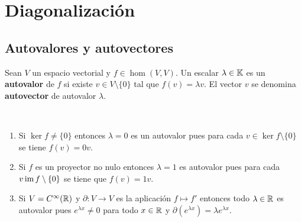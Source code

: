 \chapter{Diagonalización}


\section{Autovalores y autovectores}

\begin{block}
    Sean $V$ un espacio vectorial y $f\in\hom(V,V)$. Un escalar $\lambda\in\mathbb{K}$
    es un \textbf{autovalor} de $f$ si existe $v\in V\setminus\{0\}$ tal que
    $f(v)=\lambda v$. El vector $v$ se denomina \textbf{autovector} de
    autovalor $\lambda$. 
\end{block}

\begin{examples}\
    \begin{enumerate}
        \item Si $\ker f\ne\{0\}$ entonces $\lambda=0$ es un autovalor pues
            para cada $v\in\ker f\setminus\{0\}$ se tiene $f(v)=0v$. 
        \item Si $f$ es un proyector no nulo entonces $\lambda=1$ es autovalor
            pues para cada $v\operatorname{im} f\setminus\{0\}$ se tiene que $f(v)=1v$. 
        \item Si $V=C^{\infty}(\mathbb{R})$ y $\partial\colon V\to V$ es la aplicación $f\mapsto f'$ entonces
            todo $\lambda\in\mathbb{R}$ es autovalor pues $e^{\lambda x}\ne0$ para todo $x\in\mathbb{R}$ y 
            $\partial(e^{\lambda x})=\lambda e^{\lambda x}$. 
    \end{enumerate}
\end{examples}

